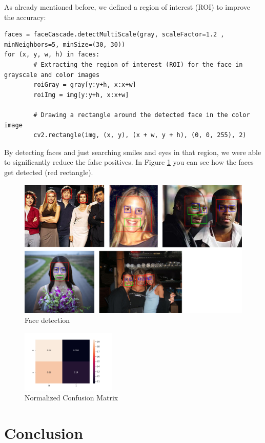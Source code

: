 \documentclass[11pt, a4paper, twocolumn]{article}
\begin{document}
As already mentioned before, we defined a region of interest (ROI) to improve the accuracy:
\begin{lstlisting}
faces = faceCascade.detectMultiScale(gray, scaleFactor=1.2 , minNeighbors=5, minSize=(30, 30))
for (x, y, w, h) in faces:
        # Extracting the region of interest (ROI) for the face in grayscale and color images
        roiGray = gray[y:y+h, x:x+w] 
        roiImg = img[y:y+h, x:x+w]

        # Drawing a rectangle around the detected face in the color image
        cv2.rectangle(img, (x, y), (x + w, y + h), (0, 0, 255), 2)
\end{lstlisting}
By detecting faces and just searching smiles and eyes in that region, we were able to significantly reduce the false positives. In Figure \ref{fig:04_withFaces} you can see how the faces get detected (red rectangle). 
%
\begin{figure}[H]
 \includegraphics[width=1\columnwidth]{images/04_withFaceRectangle.png}
 \centering
 \setlength{\abovecaptionskip}{1pt}
 \caption{Face detection}
 \label{fig:04_withFaces}
\end{figure}

%
\begin{figure}[h]
    \centering
    \includegraphics[width=0.4\textwidth]{images/confusion_matrix.png}
    \caption{Normalized Confusion Matrix}
    \label{fig:conf_matrix}
\end{figure}

\section*{Conclusion}




{}

%
\end{document}
